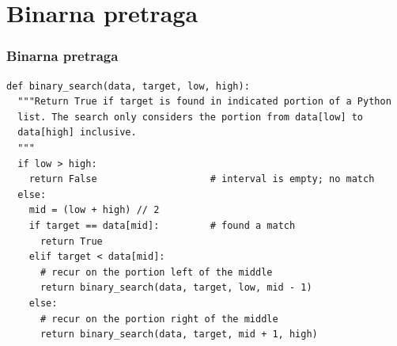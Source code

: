 \documentclass[compress]{beamer}
\begin{document}
\section[Binarna pretraga]{Binarna pretraga}
\begin{frame}[fragile,shrink=15]
  \frametitle{Binarna pretraga}
\begin{verbatim}
def binary_search(data, target, low, high):
  """Return True if target is found in indicated portion of a Python 
  list. The search only considers the portion from data[low] to 
  data[high] inclusive.
  """
  if low > high:
    return False                    # interval is empty; no match
  else:
    mid = (low + high) // 2
    if target == data[mid]:         # found a match
      return True
    elif target < data[mid]:
      # recur on the portion left of the middle
      return binary_search(data, target, low, mid - 1)
    else:
      # recur on the portion right of the middle
      return binary_search(data, target, mid + 1, high)
\end{verbatim}  
\end{frame}
\end{document}
